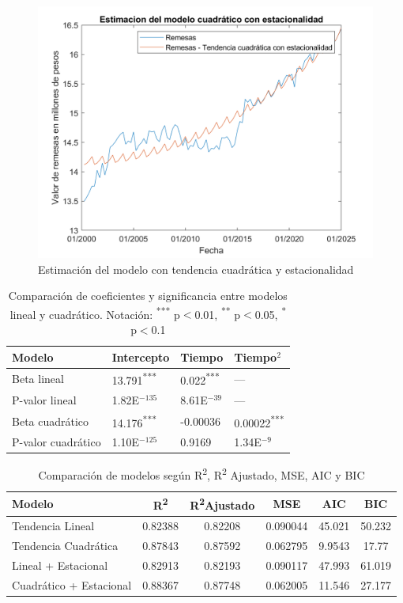 \documentclass{article}
\theoremstyle{remark}
\theoremstyle{definition}
\begin{document}
\begin{enumerate}[label=\emph{\alph*})]
\begin{tcolorbox}[title=Soluci\'on 3.c]
        \begin{figure}[H]
            \centering
            \includegraphics[width=0.5\linewidth]{docs/Remesas_cuadratico_estacionalidad.png}
            \caption{Estimación del modelo con tendencia cuadrática y estacionalidad}
            \label{fig:enter-label}
        \end{figure}


\begin{table}[H]
\centering
\scriptsize
\begin{tabular}{|l|l|l|l|}
\hline
\textbf{Modelo} & \textbf{Intercepto} & \textbf{Tiempo} & \textbf{Tiempo$^2$} \\
\hline
Beta lineal & 13.791\textsuperscript{***} & 0.022\textsuperscript{***} & --- \\
P-valor lineal & 1.82E$^{-135}$ & 8.61E$^{-39}$ & --- \\
\hline
Beta cuadrático & 14.176\textsuperscript{***} & -0.00036 & 0.00022\textsuperscript{***} \\
P-valor cuadrático & 1.10E$^{-125}$ & 0.9169 & 1.34E$^{-9}$ \\
\hline
\end{tabular}
\caption{Comparación de coeficientes y significancia entre modelos lineal y cuadrático. Notación: \textsuperscript{***} p$<$0.01, \textsuperscript{**} p$<$0.05, \textsuperscript{*} p$<$0.1}
\end{table}

\begin{table}[H]
\centering
\scriptsize
\begin{tabular}{lccccc}
\toprule
\textbf{Modelo} & \textbf{R\textsuperscript{2}} & \textbf{R\textsuperscript{2}Ajustado} & \textbf{MSE} & \textbf{AIC} & \textbf{BIC} \\
\midrule
Tendencia Lineal & 0.82388 & 0.82208 & 0.090044 & 45.021 & 50.232 \\
Tendencia Cuadrática & 0.87843 & 0.87592 & 0.062795 & 9.9543 & 17.77 \\
Lineal + Estacional & 0.82913 & 0.82193 & 0.090117 & 47.993 & 61.019 \\
Cuadrático + Estacional & 0.88367 & 0.87748 & 0.062005 & 11.546 & 27.177 \\
\bottomrule
\end{tabular}
\caption{Comparación de modelos según R\textsuperscript{2}, R\textsuperscript{2} Ajustado, MSE, AIC y BIC}
\end{table}
        

\end{tcolorbox}
\end{enumerate}
\end{document}
